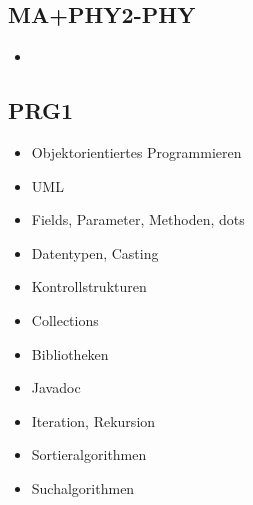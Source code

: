 \subsection{MA+PHY2-PHY}
\begin{itemize}
  \item 
\end{itemize}

\subsection{PRG1}
\begin{itemize}
  \item Objektorientiertes Programmieren
  \item UML
  \item Fields, Parameter, Methoden, dots
  \item Datentypen, Casting
  \item Kontrollstrukturen
  \item Collections
  \item Bibliotheken
  \item Javadoc
  \item Iteration, Rekursion
  \item Sortieralgorithmen
  \item Suchalgorithmen
\end{itemize}
